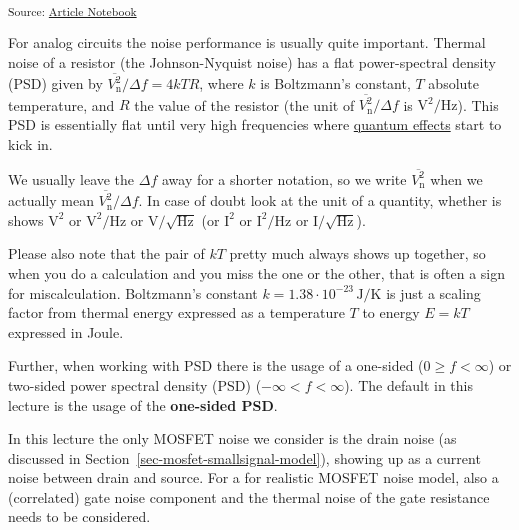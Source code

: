 \documentclass[
  a4paper,
  DIV=11,
  numbers=noendperiod]{scrartcl}
\begin{document}
\textsubscript{Source:
\href{https://iic-jku.github.io/analog-circuit-design/index.qmd.html}{Article
Notebook}}

For analog circuits the noise performance is usually quite important.
Thermal noise of a resistor (the Johnson-Nyquist noise) has a flat
power-spectral density (PSD) given by
\(\overline{V_\mathrm{n}^2}/\Delta f = 4 k T R\), where \(k\) is
Boltzmann's constant, \(T\) absolute temperature, and \(R\) the value of
the resistor (the unit of \(\overline{V_\mathrm{n}^2}/\Delta f\) is
\(\text{V}^2/\text{Hz}\)). This PSD is essentially flat until very high
frequencies where
\href{https://en.wikipedia.org/wiki/Johnson–Nyquist_noise}{quantum
effects} start to kick in.

\begin{tcolorbox}[enhanced jigsaw, titlerule=0mm, left=2mm, coltitle=black, toprule=.15mm, breakable, opacitybacktitle=0.6, colframe=quarto-callout-note-color-frame, bottomtitle=1mm, toptitle=1mm, opacityback=0, colbacktitle=quarto-callout-note-color!10!white, title=\textcolor{quarto-callout-note-color}{\faInfo}\hspace{0.5em}{Noise Notation}, arc=.35mm, rightrule=.15mm, colback=white, bottomrule=.15mm, leftrule=.75mm]

We usually leave the \(\Delta f\) away for a shorter notation, so we
write \(\overline{V_\mathrm{n}^2}\) when we actually mean
\(\overline{V_\mathrm{n}^2}/\Delta f\). In case of doubt look at the
unit of a quantity, whether is shows \(\text{V}^2\) or
\(\text{V}^2/\text{Hz}\) or \(\text{V}/\sqrt{\text{Hz}}\) (or
\(\text{I}^2\) or \(\text{I}^2/\text{Hz}\) or
\(\text{I}/\sqrt{\text{Hz}}\)).

Please also note that the pair of \(k T\) pretty much always shows up
together, so when you do a calculation and you miss the one or the
other, that is often a sign for miscalculation. Boltzmann's constant
\(k = 1.38 \cdot 10^{-23}\,\text{J/K}\) is just a scaling factor from
thermal energy expressed as a temperature \(T\) to energy \(E = k T\)
expressed in Joule.

Further, when working with PSD there is the usage of a one-sided
(\(0 \ge f < \infty\)) or two-sided power spectral density (PSD)
(\(-\infty < f < \infty\)). The default in this lecture is the usage of
the \textbf{one-sided PSD}.

\end{tcolorbox}

In this lecture the only MOSFET noise we consider is the drain noise (as
discussed in Section~\ref{sec-mosfet-smallsignal-model}), showing up as
a current noise between drain and source. For a for realistic MOSFET
noise model, also a (correlated) gate noise component and the thermal
noise of the gate resistance needs to be considered.
\end{document}
